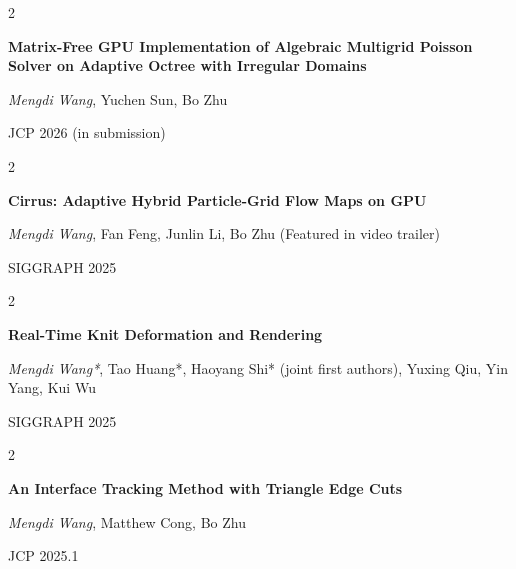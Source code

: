 \documentclass[10pt, letterpaper]{article}
\newenvironment{twocolentry}[2][]{
    \onecolentry
    \def\secondColumn{#2}
    \setcolumnwidth{\fill, 4.5 cm}
    \begin{paracol}{2}
}{
    \switchcolumn \raggedleft \secondColumn
    \end{paracol}
    \endonecolentry
} %
\begin{document}
    \begin{samepage}
        \begin{twocolentry}{
            JCP 2026 (in submission)
        }
            \textbf{Matrix-Free GPU Implementation of Algebraic Multigrid Poisson Solver on Adaptive Octree with Irregular Domains}

            \vspace{0.10 cm}

            \textit{Mengdi Wang}, Yuchen Sun, Bo Zhu
        \end{twocolentry}

        \vspace{0.10 cm}
    
        \begin{twocolentry}{
            SIGGRAPH 2025
        }
            \textbf{Cirrus: Adaptive Hybrid Particle-Grid Flow Maps on GPU}

            \vspace{0.10 cm}

            \textit{Mengdi Wang}, Fan Feng, Junlin Li, Bo Zhu (Featured in video trailer)
        \end{twocolentry}

        \vspace{0.10 cm}

        \begin{twocolentry}{
            SIGGRAPH 2025
        }
            \textbf{Real-Time Knit Deformation and Rendering}

            \vspace{0.10 cm}

            \textit{Mengdi Wang*}, Tao Huang*, Haoyang Shi* (joint first authors), Yuxing Qiu, Yin Yang, Kui Wu
        \end{twocolentry}

        \vspace{0.10 cm}

        \begin{twocolentry}{
            JCP 2025.1
        }
            \textbf{An Interface Tracking Method with Triangle Edge Cuts}

            \vspace{0.10 cm}

            \textit{Mengdi Wang}, Matthew Cong, Bo Zhu
        \end{twocolentry}

        \vspace{0.10 cm}


\end{samepage}
\end{document}
